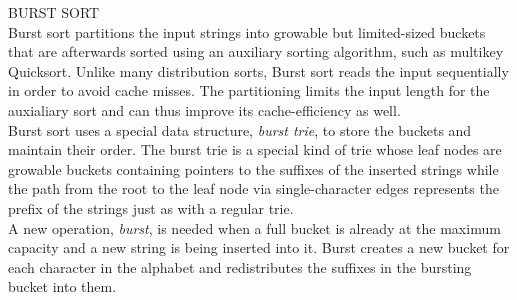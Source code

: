 {\sffamily\normalsize{\color{sciorange} BURST SORT}}\vspace{1mm}\\
\footnotesize 
Burst sort partitions the input strings into growable but
limited-sized buckets that are afterwards sorted using an auxiliary
sorting algorithm, such as multikey Quicksort. Unlike many
distribution sorts, Burst sort reads the input sequentially in order
to avoid cache misses.  The partitioning limits the input length for
the auxialiary sort and can thus improve its cache-efficiency as
well.\\

Burst sort uses a special data structure, \emph{burst trie}, to store
the buckets and maintain their order. The burst trie is a special kind
of trie whose leaf nodes are growable buckets containing pointers to
the suffixes of the inserted strings while the path from the root to
the leaf node via single-character edges represents the prefix of the
strings just as with a regular trie.\\

A new operation, \emph{burst}, is needed when a full bucket is already
at the maximum capacity and a new string is being inserted into
it. Burst creates a new bucket for each character in the alphabet and
redistributes the suffixes in the bursting bucket into them.\\

